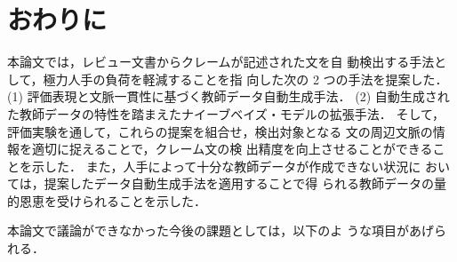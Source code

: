 \documentclass[japanese]{jnlp_1.4}
\begin{document}
\section{おわりに}
\label{sec:owarini}

本論文では，レビュー文書からクレームが記述された文を自
動検出する手法として，極力人手の負荷を軽減することを指
向した次の 2 つの手法を提案した．
(1) 評価表現と文脈一貫性に基づく教師データ自動生成手法．
(2) 自動生成された教師データの特性を踏まえたナイーブベイズ・モデルの拡張手法．
そして，評価実験を通して，これらの提案を組合せ，検出対象となる
文の周辺文脈の情報を適切に捉えることで，クレーム文の検
出精度を向上させることができることを示した．
また，人手によって十分な教師データが作成できない状況に
おいては，提案したデータ自動生成手法を適用することで得
られる教師データの量的恩恵を受けられることを示した．

本論文で議論ができなかった今後の課題としては，以下のよ
うな項目があげられる．
\end{document}

